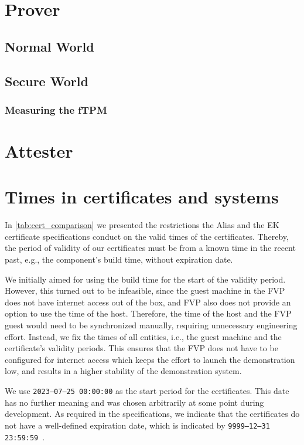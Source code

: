 \section{Prover}
\subsection{Normal World}

\subsection{Secure World}

\subsubsection{Measuring the fTPM}

\section{Attester}

\section{Times in certificates and systems}

In \autoref{tab:cert_comparison} we presented the restrictions the Alias and the EK certificate specifications conduct on the valid times of the certificates.
Thereby, the period of validity of our certificates must be from a known time in the recent past, e.g., the component's build time, without expiration date.

We initially aimed for using the build time for the start of the validity period.
However, this turned out to be infeasible, since the guest machine in the FVP does not have internet access out of the box, and FVP also does not provide an option to use the time of the host.
Therefore, the time of the host and the FVP guest would need to be synchronized manually, requiring unnecessary engineering effort.
Instead, we fix the times of all entities, i.e., the guest machine and the certificate's validity periods.
This ensures that the FVP does not have to be configured for internet access which keeps the effort to launch the demonstration low, and results in a higher stability of the demonstration system.

We use \texttt{2023--07--25 00:00:00} as the start period for the certificates.
This date has no further meaning and was chosen arbitrarily at some point during development.
As required in the specifications, we indicate that the certificates do not have a well-defined expiration date, which is indicated by \texttt{9999--12--31 23:59:59}~\cite{Boeyen2008}.

